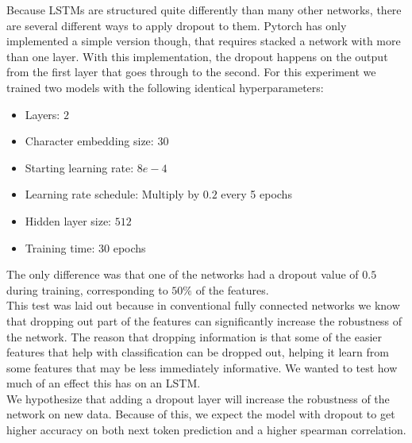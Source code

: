 Because LSTMs are structured quite differently than many other networks, there are several different ways to apply dropout to them.\cite{dropout} Pytorch has only implemented a simple version though, that requires stacked a network with more than one layer. With this implementation, the dropout happens on the output from the first layer that goes through to the second. For this experiment we trained two models with the following identical hyperparameters:
\begin{itemize}
    \item Layers: $2$
    \item Character embedding size: 30
    \item Starting learning rate: $8e-4$
    \item Learning rate schedule: Multiply by $0.2$ every 5 epochs
    \item Hidden layer size: $512$
    \item Training time: 30 epochs
\end{itemize}
The only difference was that one of the networks had a dropout value of $0.5$ during training, corresponding to $50\%$ of the features.\\

\noindent
This test was laid out because in conventional fully connected networks we know that dropping out part of the features can significantly increase the robustness of the network. The reason that dropping information is that some of the easier features that help with classification can be dropped out, helping it learn from some features that may be less immediately informative. We wanted to test how much of an effect this has on an LSTM.\\

\noindent
We hypothesize that adding a dropout layer will increase the robustness of the network on new data. Because of this, we expect the model with dropout to get higher accuracy on both next token prediction and a higher spearman correlation.

%
